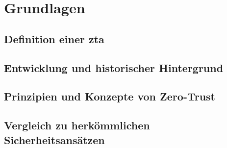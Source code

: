 \newpage


\section{Grundlagen}\label{sec:grundlagen}
\subsection[Definition einer Zero-Trust-Architektur]{Definition einer \ac{zta}}\label{subsec:definition-einer-zta}
\subsection{Entwicklung und historischer Hintergrund}\label{subsec:entwicklung-und-historischer-hintergrund}

\subsection{Prinzipien und Konzepte von Zero-Trust}\label{subsec:prinzipien-und-konzepte-von-zero-trust}

\subsection{Vergleich zu herkömmlichen Sicherheitsansätzen}\label{subsec:vergleich-zu-herkommlichen-sicherheitsansatzen}
